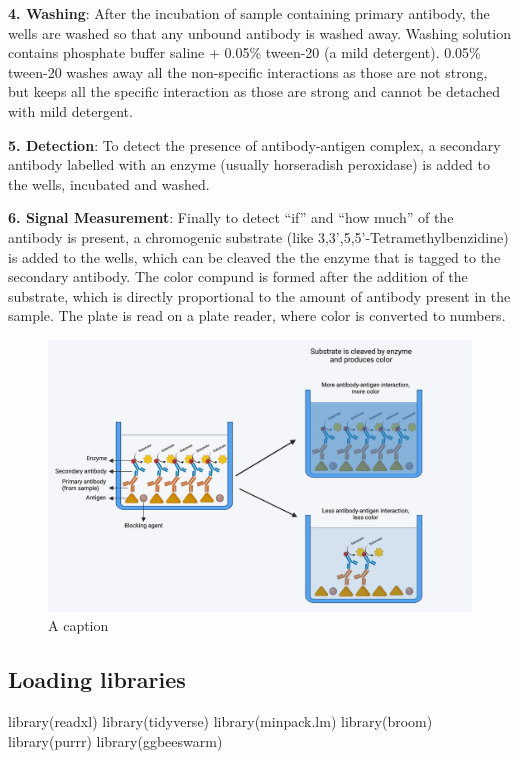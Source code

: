 \documentclass[
]{book}
\newenvironment{Shaded}{\begin{snugshade}}{\end{snugshade}}
\newcommand{\FunctionTok}[1]{\textcolor[rgb]{0.00,0.00,0.00}{#1}}
\newcommand{\NormalTok}[1]{#1}
\begin{document}
\textbf{4. Washing}: After the incubation of sample containing primary antibody, the wells are washed so that any unbound antibody is washed away. Washing solution contains phosphate buffer saline + 0.05\% tween-20 (a mild detergent). 0.05\% tween-20 washes away all the non-specific interactions as those are not strong, but keeps all the specific interaction as those are strong and cannot be detached with mild detergent.

\textbf{5. Detection}: To detect the presence of antibody-antigen complex, a secondary antibody labelled with an enzyme (usually horseradish peroxidase) is added to the wells, incubated and washed.

\textbf{6. Signal Measurement}: Finally to detect ``if'' and ``how much'' of the antibody is present, a chromogenic substrate (like 3,3',5,5'-Tetramethylbenzidine) is added to the wells, which can be cleaved the the enzyme that is tagged to the secondary antibody. The color compund is formed after the addition of the substrate, which is directly proportional to the amount of antibody present in the sample. The plate is read on a plate reader, where color is converted to numbers.

\begin{figure}
\includegraphics[width=1\linewidth]{DATA/elisa} \caption{A caption}\label{fig:pressure}
\end{figure}

\hypertarget{loading-libraries}{%
\subsection{Loading libraries}\label{loading-libraries}}

\begin{Shaded}
\begin{Highlighting}[]
\FunctionTok{library}\NormalTok{(readxl)}
\FunctionTok{library}\NormalTok{(tidyverse)}
\FunctionTok{library}\NormalTok{(minpack.lm)}
\FunctionTok{library}\NormalTok{(broom)}
\FunctionTok{library}\NormalTok{(purrr)}
\FunctionTok{library}\NormalTok{(ggbeeswarm)}
\end{Highlighting}
\end{Shaded}
\end{document}
